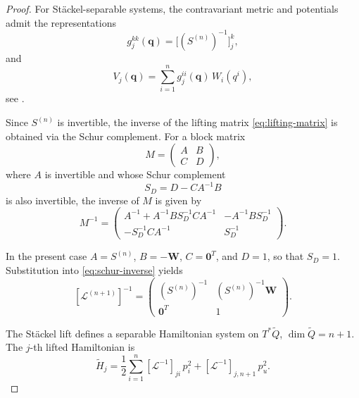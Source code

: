 \documentclass[10pt,a4paper]{amsart}
\begin{document}
\begin{proof}
	For Stäckel-separable systems, the contravariant metric and potentials admit
	the representations
	\begin{equation}\label{eq:metric-stackel}
		g^{kk}_j(\boldsymbol{q})=\bigl[(S^{(n)})^{-1}\bigr]_{j}^{k},
	\end{equation}
	and
	\begin{equation}\label{eq:potential-stackel}
		V_j(\boldsymbol{q})=\sum_{i=1}^n g^{ii}_j(\boldsymbol{q})\, W_i(q^i),
	\end{equation}
	see \cite{Benenti1997}.
	
	Since $S^{(n)}$ is invertible, the inverse of the lifting matrix
	\eqref{eq:lifting-matrix} is obtained via the Schur complement.
	For a block matrix
	\begin{equation}\label{eq:block-matrix}
		M=\begin{pmatrix} A & B \\ C & D \end{pmatrix},
	\end{equation}
	where $A$ is invertible and whose Schur complement
	\begin{equation}\label{eq:schur-complement}
		S_D = D - C A^{-1} B
	\end{equation}
	is also invertible, the inverse of $M$ is given by
	\begin{equation}\label{eq:schur-inverse}
		M^{-1}
		=
		\begin{pmatrix}
			A^{-1} + A^{-1} B S_D^{-1} C A^{-1}
			& -A^{-1} B S_D^{-1} \\
			- S_D^{-1} C A^{-1}
			& S_D^{-1}
		\end{pmatrix}.
	\end{equation}
	
	In the present case $A=S^{(n)}$, $B=-\boldsymbol{W}$,
	$C=\boldsymbol{0}^T$, and $D=1$, so that $S_D=1$. Substitution into
	\eqref{eq:schur-inverse} yields
	\begin{equation}\label{eq:lifted-inverse}
		[\mathcal{L}^{(n+1)}]^{-1}
		=
		\begin{pmatrix}
			(S^{(n)})^{-1} & (S^{(n)})^{-1}\boldsymbol{W} \\
			\boldsymbol{0}^T & 1
		\end{pmatrix}.
	\end{equation}
	
	The Stäckel lift defines a separable Hamiltonian system on $T^*\tilde Q$,
	$\dim\tilde Q=n+1$. The $j$-th lifted Hamiltonian is
	\begin{equation}\label{eq:H-tilde-def}
		\tilde H_j
		= \frac{1}{2}\sum_{i=1}^n [\mathcal{L}^{-1}]_{ji}\, p_i^2
		+ [\mathcal{L}^{-1}]_{j,n+1}\, p_u^2 .
	\end{equation}
	

\end{proof}
\end{document}
